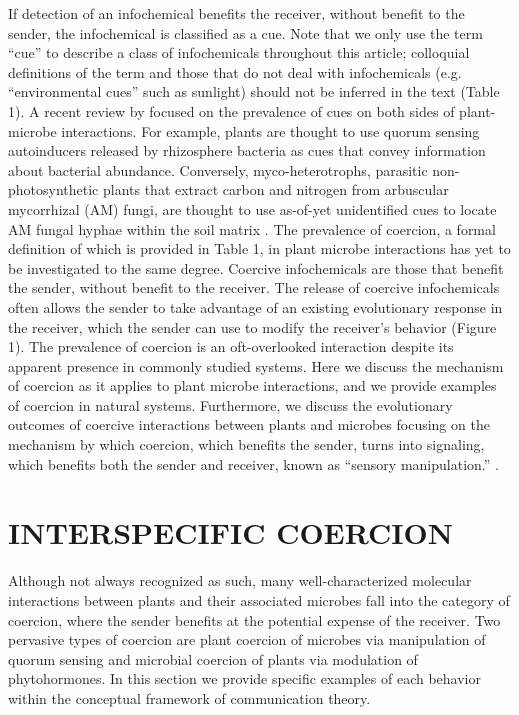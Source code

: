 \documentclass[PhD]{msu-thesis}
\begin{document}
If detection of an infochemical benefits the receiver, without benefit to the sender, the infochemical is classified as a cue. Note that we only use the term “cue” to describe a class of infochemicals throughout this article; colloquial definitions of the term and those that do not deal with infochemicals (e.g. “environmental cues” such as sunlight) should not be inferred in the text (Table 1). A recent review by \cite{padje2016} focused on the prevalence of cues on both sides of plant-microbe interactions. For example, plants are thought to use quorum sensing autoinducers released by rhizosphere bacteria as cues that convey information about bacterial abundance. Conversely, myco-heterotrophs, parasitic non-photosynthetic plants that extract carbon and nitrogen from arbuscular mycorrhizal (AM) fungi, are thought to use as-of-yet unidentified cues to locate AM fungal hyphae within the soil matrix \cite{rasmussen2015}. 	
The prevalence of coercion, a formal definition of which is provided in Table 1, in plant microbe interactions has yet to be investigated to the same degree. Coercive infochemicals are those that benefit the sender, without benefit to the receiver. The release of coercive infochemicals often allows the sender to take advantage of an existing evolutionary response in the receiver, which the sender can use to modify the receiver’s behavior (Figure 1). The prevalence of coercion is an oft-overlooked interaction despite its apparent presence in commonly studied systems. Here we discuss the mechanism of coercion as it applies to plant microbe interactions, and we provide examples of coercion in natural systems. Furthermore, we discuss the evolutionary outcomes of coercive interactions between plants and microbes focusing on the mechanism by which coercion, which benefits the sender, turns into signaling, which benefits both the sender and receiver, known as “sensory manipulation.” \cite{scott-phillips2008,scott-phillips2012}. 

\section{INTERSPECIFIC COERCION}
Although not always recognized as such, many well-characterized molecular interactions between plants and their associated microbes fall into the category of coercion, where the sender benefits at the potential expense of the receiver. Two pervasive types of coercion are plant coercion of microbes via manipulation of quorum sensing and microbial coercion of plants via modulation of phytohormones. In this section we provide specific examples of each behavior within the conceptual framework of communication theory. 
\end{document}
